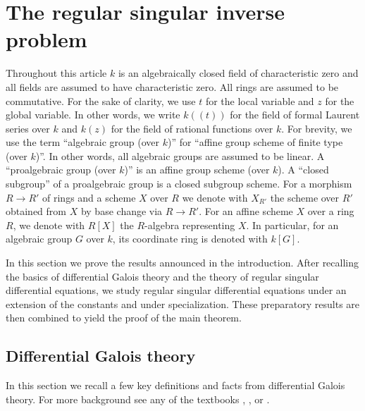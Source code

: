 \documentclass[a4paper, 11pt]{article}
\begin{document}

\section{The regular singular inverse problem}

Throughout this article $k$ is an algebraically closed field of characteristic zero and all fields are assumed to have characteristic zero. All rings are assumed to be commutative. For the sake of clarity, we use $t$ for the local variable and $z$ for the global variable. In other words, we write $k((t))$ for the field of formal Laurent series over $k$ and $k(z)$ for the field of rational functions over $k$. For brevity, we use the term ``algebraic group (over $k$)'' for ``affine group scheme of finite type (over $k$)''. In other words, all algebraic groups are assumed to be linear.
A ``proalgebraic group (over $k$)'' is an affine group scheme (over $k$). A ``closed subgroup'' of a proalgebraic group is a closed subgroup scheme.
For a morphism $R\to R'$ of rings and a scheme $X$ over $R$ we denote with $X_{R'}$ the scheme over $R'$ obtained from $X$ by base change via $R\to R'$. For an affine scheme $X$ over a ring $R$, we denote with $R[X]$ the $R$-algebra representing $X$. In particular, for an algebraic group $G$ over $k$, its coordinate ring is denoted with $k[G]$.

\medskip

In this section we prove the results announced in the introduction. After recalling the basics of differential Galois theory and the theory of regular singular differential equations, we study regular singular differential equations under an extension of the constants and under specialization. These preparatory results are then combined to yield the proof of the main theorem.
	
\subsection{Differential Galois theory}
	
In this section we recall a few key definitions and facts from differential Galois theory. For more background see any of the textbooks \cite{SVDP}, \cite{Magdid:Lectures}, \cite{CrespoHajto} or \cite{Saul}.
\end{document}
